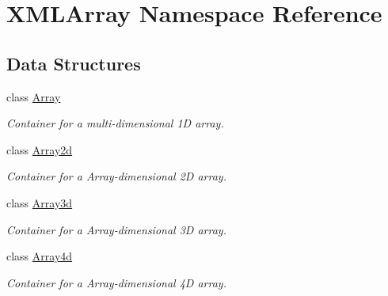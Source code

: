 \hypertarget{namespaceXMLArray}{}\section{X\+M\+L\+Array Namespace Reference}
\label{namespaceXMLArray}
\subsection*{Data Structures}
\begin{DoxyCompactItemize}
\item 
class \mbox{\hyperlink{classXMLArray_1_1Array}{Array}}
\begin{DoxyCompactList}\small\item\em Container for a multi-\/dimensional 1D array. \end{DoxyCompactList}\item 
class \mbox{\hyperlink{classXMLArray_1_1Array2d}{Array2d}}
\begin{DoxyCompactList}\small\item\em Container for a Array-\/dimensional 2D array. \end{DoxyCompactList}\item 
class \mbox{\hyperlink{classXMLArray_1_1Array3d}{Array3d}}
\begin{DoxyCompactList}\small\item\em Container for a Array-\/dimensional 3D array. \end{DoxyCompactList}\item 
class \mbox{\hyperlink{classXMLArray_1_1Array4d}{Array4d}}
\begin{DoxyCompactList}\small\item\em Container for a Array-\/dimensional 4D array. \end{DoxyCompactList}\end{DoxyCompactItemize}
